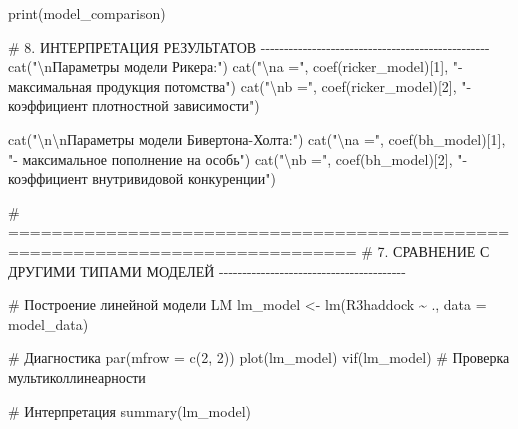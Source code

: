 \documentclass[
  letterpaper,
  DIV=11,
  numbers=noendperiod]{scrreprt}
\newenvironment{Shaded}{\begin{snugshade}}{\end{snugshade}}
\newcommand{\AttributeTok}[1]{\textcolor[rgb]{0.40,0.45,0.13}{#1}}
\newcommand{\CommentTok}[1]{\textcolor[rgb]{0.37,0.37,0.37}{#1}}
\newcommand{\DecValTok}[1]{\textcolor[rgb]{0.68,0.00,0.00}{#1}}
\newcommand{\FunctionTok}[1]{\textcolor[rgb]{0.28,0.35,0.67}{#1}}
\newcommand{\NormalTok}[1]{\textcolor[rgb]{0.00,0.23,0.31}{#1}}
\newcommand{\OtherTok}[1]{\textcolor[rgb]{0.00,0.23,0.31}{#1}}
\newcommand{\SpecialCharTok}[1]{\textcolor[rgb]{0.37,0.37,0.37}{#1}}
\newcommand{\StringTok}[1]{\textcolor[rgb]{0.13,0.47,0.30}{#1}}
\begin{document}
\begin{Shaded}
\begin{Highlighting}[]
\FunctionTok{print}\NormalTok{(model\_comparison)}

\CommentTok{\# 8. ИНТЕРПРЕТАЦИЯ РЕЗУЛЬТАТОВ {-}{-}{-}{-}{-}{-}{-}{-}{-}{-}{-}{-}{-}{-}{-}{-}{-}{-}{-}{-}{-}{-}{-}{-}{-}{-}{-}{-}{-}{-}{-}{-}{-}{-}{-}{-}{-}{-}{-}{-}{-}{-}{-}{-}{-}{-}{-}{-}{-}}
\FunctionTok{cat}\NormalTok{(}\StringTok{"}\SpecialCharTok{\textbackslash{}n}\StringTok{Параметры модели Рикера:"}\NormalTok{)}
\FunctionTok{cat}\NormalTok{(}\StringTok{"}\SpecialCharTok{\textbackslash{}n}\StringTok{a ="}\NormalTok{, }\FunctionTok{coef}\NormalTok{(ricker\_model)[}\DecValTok{1}\NormalTok{], }\StringTok{"{-} максимальная продукция потомства"}\NormalTok{)}
\FunctionTok{cat}\NormalTok{(}\StringTok{"}\SpecialCharTok{\textbackslash{}n}\StringTok{b ="}\NormalTok{, }\FunctionTok{coef}\NormalTok{(ricker\_model)[}\DecValTok{2}\NormalTok{], }\StringTok{"{-} коэффициент плотностной зависимости"}\NormalTok{)}

\FunctionTok{cat}\NormalTok{(}\StringTok{"}\SpecialCharTok{\textbackslash{}n\textbackslash{}n}\StringTok{Параметры модели Бивертона{-}Холта:"}\NormalTok{)}
\FunctionTok{cat}\NormalTok{(}\StringTok{"}\SpecialCharTok{\textbackslash{}n}\StringTok{a ="}\NormalTok{, }\FunctionTok{coef}\NormalTok{(bh\_model)[}\DecValTok{1}\NormalTok{], }\StringTok{"{-} максимальное пополнение на особь"}\NormalTok{)}
\FunctionTok{cat}\NormalTok{(}\StringTok{"}\SpecialCharTok{\textbackslash{}n}\StringTok{b ="}\NormalTok{, }\FunctionTok{coef}\NormalTok{(bh\_model)[}\DecValTok{2}\NormalTok{], }\StringTok{"{-} коэффициент внутривидовой конкуренции"}\NormalTok{)}

\CommentTok{\# ==============================================================================}
\CommentTok{\# 7. СРАВНЕНИЕ С ДРУГИМИ ТИПАМИ МОДЕЛЕЙ {-}{-}{-}{-}{-}{-}{-}{-}{-}{-}{-}{-}{-}{-}{-}{-}{-}{-}{-}{-}{-}{-}{-}{-}{-}{-}{-}{-}{-}{-}{-}{-}{-}{-}{-}{-}{-}{-}{-}{-}}

\CommentTok{\# Построение линейной модели LM}
\NormalTok{lm\_model }\OtherTok{\textless{}{-}} \FunctionTok{lm}\NormalTok{(R3haddock }\SpecialCharTok{\textasciitilde{}}\NormalTok{ ., }\AttributeTok{data =}\NormalTok{ model\_data)}

\CommentTok{\# Диагностика}
\FunctionTok{par}\NormalTok{(}\AttributeTok{mfrow =} \FunctionTok{c}\NormalTok{(}\DecValTok{2}\NormalTok{, }\DecValTok{2}\NormalTok{))}
\FunctionTok{plot}\NormalTok{(lm\_model)}
\FunctionTok{vif}\NormalTok{(lm\_model)  }\CommentTok{\# Проверка мультиколлинеарности}

\CommentTok{\# Интерпретация}
\FunctionTok{summary}\NormalTok{(lm\_model)}


\end{Highlighting}
\end{Shaded}
\end{document}
